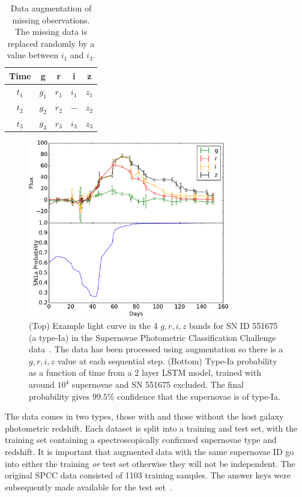 \documentclass[twocolumn]{aastex61}
\begin{document}
\begin{table}[htdp]
\begin{center}
\begin{tabular}{|c|c|c|c|c|}\hline  
 Time&g&r&i&z\\\hline\hline 
$t_1$&$g_1$&$r_1$&$i_1$&$z_1$\\\hline 
$t_2$&$g_2$&$r_2$&$-$&$z_2$\\\hline 
$t_3$&$g_3$&$r_3$&$i_3$& $z_3$\\\hline 
 \end{tabular}
\end{center}
\caption{\label{tab:augment} Data augmentation of missing observations. The missing data is replaced randomly by a value between $i_1$ and $i_3$.}
\end{table}%

\begin{figure}
\centering
\includegraphics[width=88mm, angle=0]{f2.pdf}
\caption{\label{fig:lightcurve} (Top) Example light curve in the 4 $g,r,i,z$ bands for SN ID 551675 (a type-Ia) in the Supernovae Photometric Classification Challenge data~\cite{Kessler:2010wk}. The data has been processed using augmentation so there is a $g,r,i,z$ value at each sequential step. (Bottom) Type-Ia probability as a function of time from a 2 layer LSTM model, trained with around $10^4$ supernovae and SN 551675 excluded. The final probability gives $99.5\%$ confidence that the supernovae is of type-Ia. 
 }
\end{figure}


The data comes in two types, those with and those without the host galaxy photometric redshift. Each dataset is split into a training and test set, with the training set containing a spectroscopically confirmed supernovae type and redshift. It is important that augmented data with the same supernovae ID go into either the training {\em or} test set otherwise they will not be independent. The original SPCC data consisted of 1103 training samples. The answer keys were subsequently made available for the test set~\cite{Kessler:2010qj}. 
\end{document}
